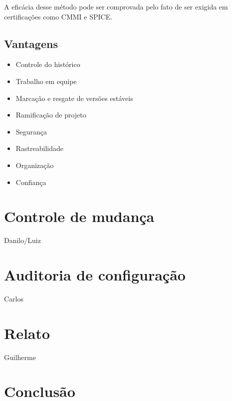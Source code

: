 \documentclass[12pt]{article}
\begin{document}
        A eficácia desse método pode ser comprovada pelo fato de ser exigida em certificações como CMMI e SPICE.
        
        \subsection{Vantagens}
            \begin{itemize}
                \item Controle do histórico
                \item Trabalho em equipe
                \item Marcação e resgate de versões estáveis
                \item Ramificação de projeto
                \item Segurança
                \item Rastreabilidade
                \item Organização
                \item Confiança
            \end{itemize}
        
    \section{Controle de mudança}
        Danilo/Luiz
    \section{Auditoria de configuração}
        Carlos
    \section{Relato}  
        Guilherme
    
    \section{Conclusão}
    
\end{document}

